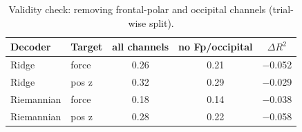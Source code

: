 \begin{table}[t]
\centering
\caption{Validity check: removing frontal-polar and occipital channels (trial-wise split).}
\label{tab:artifacts}
\footnotesize
\setlength{\tabcolsep}{3pt}
\begin{tabular}{llccc}
\toprule
Decoder & Target & all channels & no Fp/occipital & $\Delta R^2$ \\
\midrule
Ridge & force & 0.26 & 0.21 & $-$0.052 \\
Ridge & pos z & 0.32 & 0.29 & $-$0.029 \\
Riemannian & force & 0.18 & 0.14 & $-$0.038 \\
Riemannian & pos z & 0.28 & 0.22 & $-$0.058 \\
\bottomrule
\end{tabular}
\end{table}
